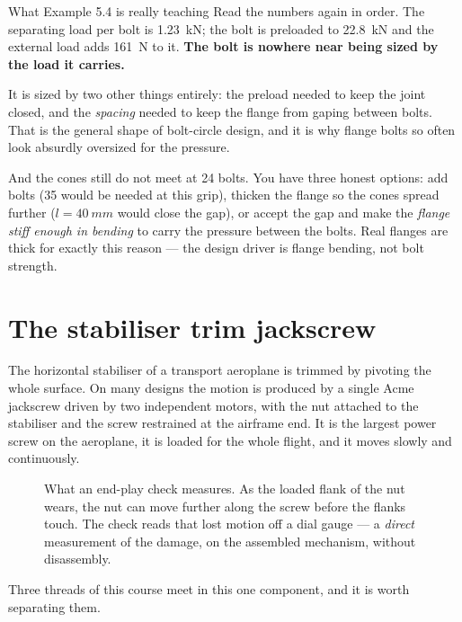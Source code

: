\documentclass[11pt,a4paper]{article}
\begin{document}
\begin{keybox}{What Example 5.4 is really teaching}
Read the numbers again in order. The separating load per bolt is \SI{1.23}{kN}; the bolt is preloaded
to \SI{22.8}{kN} and the external load adds \SI{161}{N} to it. \textbf{The bolt is nowhere near being
sized by the load it carries.}

\medskip
It is sized by two other things entirely: the preload needed to keep the joint closed, and the
\emph{spacing} needed to keep the flange from gaping between bolts. That is the general shape of
bolt-circle design, and it is why flange bolts so often look absurdly oversized for the pressure.

\medskip
And the cones still do not meet at 24 bolts. You have three honest options: add bolts (35 would be
needed at this grip), thicken the flange so the cones spread further ($l=\SI{40}{mm}$ would close the
gap), or accept the gap and make the \emph{flange stiff enough in bending} to carry the pressure
between the bolts. Real flanges are thick for exactly this reason --- the design driver is flange
bending, not bolt strength.
\end{keybox}

\section{The stabiliser trim jackscrew}

The horizontal stabiliser of a transport aeroplane is trimmed by pivoting the whole surface. On many
designs the motion is produced by a single Acme jackscrew driven by two independent motors, with the
nut attached to the stabiliser and the screw restrained at the airframe end. It is the largest power
screw on the aeroplane, it is loaded for the whole flight, and it moves slowly and continuously.

\begin{figure}[H]\centering
\resizebox{0.95\textwidth}{!}{}
\caption{What an end-play check measures. As the loaded flank of the nut wears, the nut can move
further along the screw before the flanks touch. The check reads that lost motion off a dial gauge ---
a \emph{direct} measurement of the damage, on the assembled mechanism, without disassembly.}
\end{figure}


\medskip
Three threads of this course meet in this one component, and it is worth separating them.
\end{document}
